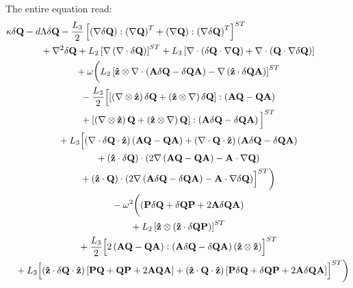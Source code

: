 \documentclass[reqno]{article}
\newcommand{\Q}{\mathbf{Q}}
\newcommand{\bP}{\mathbf{P}}
\newcommand{\A}{\mathbf{A}}
\newcommand{\z}{\mathbf{\hat{z}}}
\begin{document}
The entire equation read:
\begin{equation}
    \begin{multlined}[t]
        \kappa \delta \Q 
        - d\Lambda \delta \Q
        - \frac{L_3}{2} \left[
            \left(\nabla \delta \Q \right) : \left( \nabla \Q \right)^T
            + \left(\nabla \Q \right) : \left( \nabla \delta \Q \right)^T
        \right]^{ST} \\
        + \nabla^2 \delta \Q
        + L_2 \left[ \nabla \left( \nabla \cdot \delta \Q \right) \right]^{ST}
        + L_3 \left[
            \nabla \cdot \left( \delta \Q \cdot \nabla \Q \right) 
            + \nabla \cdot \left( \Q \cdot \nabla \delta \Q \right) 
        \right] \\
        + \omega \biggl(
            L_2 \left[
                \z \otimes \nabla \cdot \left( \A \delta \Q - \delta \Q \A \right)
                - \nabla \left( \z \cdot \delta \Q \A \right)
            \right]^{ST} \\
            - 
            \frac{L_3}{2} \Bigl[
                \left[
                    \left( \nabla \otimes \z \right) \delta \Q
                    + \left( \z \otimes \nabla \right) \delta \Q
                \right]
                : \left(\A \Q - \Q \A \right) \\
                + 
                \left[
                    \left( \nabla \otimes \z \right) \Q
                    + \left( \z \otimes \nabla \right) \Q
                \right]
                : \left(\A \delta \Q - \delta \Q \A \right)
            \Bigl]^{ST} \\
            + 
            L_3 \Bigl[
                \left( \nabla \cdot \delta \Q \cdot \z \right) \left( \A \Q - \Q \A \right)
                + \left( \nabla \cdot \Q \cdot \z \right) \left( \A \delta \Q - \delta \Q \A \right) \\
                + (\z \cdot \delta \Q) \cdot \left( 
                    2 \nabla \left( \A \Q - \Q \A \right)
                    - \A \cdot \nabla \Q
                \right) \\
                + (\z \cdot \Q) \cdot \left( 
                    2 \nabla \left( \A \delta \Q - \delta \Q \A \right)
                    - \A \cdot \nabla \delta \Q
                \right)
            \Bigr]^{ST}
        \biggr) \\
        -
        \omega^2 \biggl(
            \left( \bP \delta \Q + \delta \Q \bP + 2 \A \delta \Q \A \right) \\
            + L_2 \left[ \z \otimes \left( \z \cdot \delta \Q \bP \right) \right]^{ST} \\
            + \frac{L_3}{2} \Bigl[
                2 \left( \A \Q - \Q \A \right) : \left( \A \delta \Q - \delta \Q \A \right) \left( \z \otimes \z \right)
            \Bigr]^{ST} \\
            + L_3 \Bigl[
                \left( \z \cdot \delta \Q \cdot \z \right)
                \left[ \bP \Q + \Q \bP + 2 \A \Q \A \right]
                +
                \left( \z \cdot \Q \cdot \z \right)
                \left[ \bP \delta \Q + \delta \Q \bP + 2 \A \delta \Q \A \right]
            \Bigr]^{ST}
        \biggr)
    \end{multlined}
\end{equation}
\end{document}

